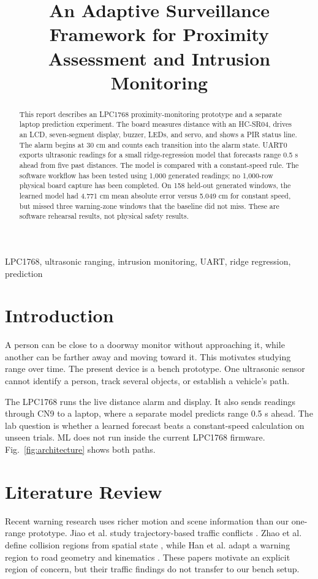\documentclass[conference]{IEEEtran}
\begin{document}
\title{An Adaptive Surveillance Framework for Proximity Assessment and Intrusion Monitoring}
\author{
}
\maketitle
\begin{abstract}
This report describes an LPC1768 proximity-monitoring prototype and a separate laptop prediction experiment. The board measures distance with an HC-SR04, drives an LCD, seven-segment display, buzzer, LEDs, and servo, and shows a PIR status line. The alarm begins at 30 cm and counts each transition into the alarm state. UART0 exports ultrasonic readings for a small ridge-regression model that forecasts range 0.5 s ahead from five past distances. The model is compared with a constant-speed rule. The software workflow has been tested using 1,000 generated readings; no 1,000-row physical board capture has been completed. On 158 held-out generated windows, the learned model had 4.771 cm mean absolute error versus 5.049 cm for constant speed, but missed three warning-zone windows that the baseline did not miss. These are software rehearsal results, not physical safety results.
\end{abstract}
\begin{IEEEkeywords}LPC1768, ultrasonic ranging, intrusion monitoring, UART, ridge regression, prediction\end{IEEEkeywords}
\section{Introduction}
A person can be close to a doorway monitor without approaching it, while another can be farther away and moving toward it. This motivates studying range over time. The present device is a bench prototype. One ultrasonic sensor cannot identify a person, track several objects, or establish a vehicle's path.

The LPC1768 runs the live distance alarm and display. It also sends readings through CN9 to a laptop, where a separate model predicts range 0.5 s ahead. The lab question is whether a learned forecast beats a constant-speed calculation on unseen trials. ML does not run inside the current LPC1768 firmware. Fig.~\ref{fig:architecture} shows both paths.

\section{Literature Review}
Recent warning research uses richer motion and scene information than our one-range prototype. Jiao et al. study trajectory-based traffic conflicts \cite{jiao2025}. Zhao et al. define collision regions from spatial state \cite{zhao2024}, while Han et al. adapt a warning region to road geometry and kinematics \cite{han2025}. These papers motivate an explicit region of concern, but their traffic findings do not transfer to our bench setup.
\end{document}
